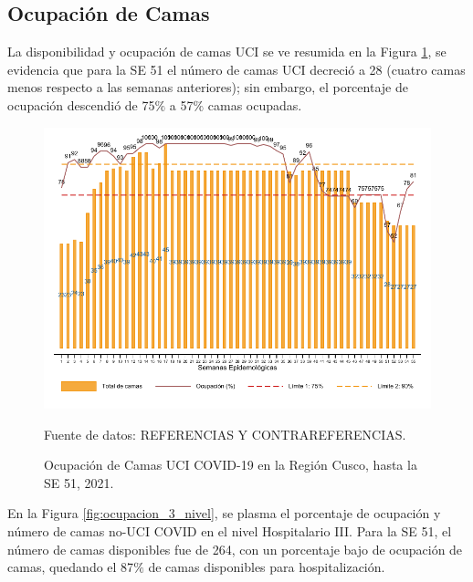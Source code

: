\documentclass[12pt,a4paper,openany]{book}
\begin{document}
\clearpage
\subsection*{Ocupación de Camas}
\noindent La disponibilidad y ocupación de camas UCI se ve resumida en la Figura \ref{fig:ocupacion_uci}, se evidencia que para la SE 51 el número de camas UCI decreció a 28 (cuatro camas menos respecto a las semanas anteriores); sin embargo,  el porcentaje de ocupación descendió de 75$\%$ a 57$\%$ camas ocupadas.

\begin{figure}[h]
	\caption{Ocupación de Camas UCI COVID-19 en la Región Cusco, hasta la SE 51, 2021.}\label{fig:ocupacion_uci}
	\begin{center}
		\includegraphics[width=0.95\linewidth]{../figuras/uci.pdf}
	\end{center}
	{\footnotesize {Fuente de datos: REFERENCIAS Y CONTRAREFERENCIAS.}}
\end{figure}
\cleardoublepage

En la Figura \ref{fig:ocupacion_3_nivel}, se plasma el porcentaje de ocupación y número de camas no-UCI COVID en el nivel Hospitalario III. Para la SE 51, el número de camas disponibles fue de 264, con un porcentaje bajo de ocupación de camas, quedando el 87$\%$ de camas disponibles para hospitalización. 
  
\end{document}
